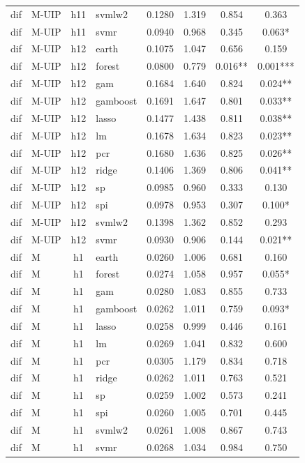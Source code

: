 \begin{ThreePartTable}
\begin{longtable}[t]{llclcccc}
dif & M-UIP & h11 & svmlw2 & 0.1280 & 1.319 & 0.854 & 0.363\\
dif & M-UIP & h11 & svmr & 0.0940 & 0.968 & 0.345 & 0.063*\\
\addlinespace
dif & M-UIP & h12 & earth & 0.1075 & 1.047 & 0.656 & 0.159\\
dif & M-UIP & h12 & forest & 0.0800 & 0.779 & 0.016** & 0.001***\\
dif & M-UIP & h12 & gam & 0.1684 & 1.640 & 0.824 & 0.024**\\
dif & M-UIP & h12 & gamboost & 0.1691 & 1.647 & 0.801 & 0.033**\\
dif & M-UIP & h12 & lasso & 0.1477 & 1.438 & 0.811 & 0.038**\\
dif & M-UIP & h12 & lm & 0.1678 & 1.634 & 0.823 & 0.023**\\
dif & M-UIP & h12 & pcr & 0.1680 & 1.636 & 0.825 & 0.026**\\
dif & M-UIP & h12 & ridge & 0.1406 & 1.369 & 0.806 & 0.041**\\
dif & M-UIP & h12 & sp & 0.0985 & 0.960 & 0.333 & 0.130\\
dif & M-UIP & h12 & spi & 0.0978 & 0.953 & 0.307 & 0.100*\\
dif & M-UIP & h12 & svmlw2 & 0.1398 & 1.362 & 0.852 & 0.293\\
dif & M-UIP & h12 & svmr & 0.0930 & 0.906 & 0.144 & 0.021**\\
\addlinespace
dif & M & h1 & earth & 0.0260 & 1.006 & 0.681 & 0.160\\
dif & M & h1 & forest & 0.0274 & 1.058 & 0.957 & 0.055*\\
dif & M & h1 & gam & 0.0280 & 1.083 & 0.855 & 0.733\\
dif & M & h1 & gamboost & 0.0262 & 1.011 & 0.759 & 0.093*\\
dif & M & h1 & lasso & 0.0258 & 0.999 & 0.446 & 0.161\\
dif & M & h1 & lm & 0.0269 & 1.041 & 0.832 & 0.600\\
dif & M & h1 & pcr & 0.0305 & 1.179 & 0.834 & 0.718\\
dif & M & h1 & ridge & 0.0262 & 1.011 & 0.763 & 0.521\\
dif & M & h1 & sp & 0.0259 & 1.002 & 0.573 & 0.241\\
dif & M & h1 & spi & 0.0260 & 1.005 & 0.701 & 0.445\\
dif & M & h1 & svmlw2 & 0.0261 & 1.008 & 0.867 & 0.743\\
dif & M & h1 & svmr & 0.0268 & 1.034 & 0.984 & 0.750\\

\end{longtable}
\end{ThreePartTable}
